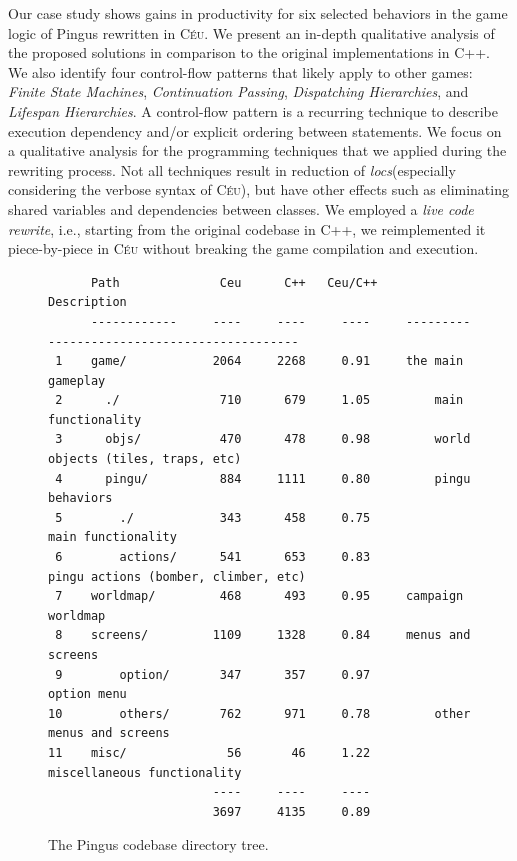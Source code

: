 \documentclass{vgtc}                          %
\newcommand{\CEU}{\textsc{C\'{e}u}\xspace}
\newcommand{\locs}{\emph{locs}\xspace}
\begin{document}
Our case study shows gains in productivity for six selected behaviors in the
game logic of Pingus rewritten in \CEU.
We present an in-depth qualitative analysis of the proposed solutions in
comparison to the original implementations in C++.
We also identify four control-flow patterns that likely apply to other games:
        \emph{Finite State Machines},
        \emph{Continuation Passing},
        \emph{Dispatching Hierarchies}, and
        \emph{Lifespan Hierarchies}.
%
A control-flow pattern is a recurring technique to describe execution
dependency and/or explicit ordering between statements.
We focus on a qualitative analysis for the programming techniques that we
applied during the rewriting process.
Not all techniques result in reduction of \locs (especially considering the
verbose syntax of \CEU), but have other effects such as eliminating shared
variables and dependencies between classes.
%
We employed a \emph{live code rewrite}, i.e., starting from the original
codebase in C++, we reimplemented it piece-by-piece in \CEU without breaking
the game compilation and execution.

\begin{figure}[t]
\begin{verbatim}
      Path              Ceu      C++   Ceu/C++    Description
      ------------     ----     ----     ----     --------------------------------------------
 1    game/            2064     2268     0.91     the main gameplay
 2      ./              710      679     1.05         main functionality
 3      objs/           470      478     0.98         world objects (tiles, traps, etc)
 4      pingu/          884     1111     0.80         pingu behaviors
 5        ./            343      458     0.75             main functionality
 6        actions/      541      653     0.83             pingu actions (bomber, climber, etc)
 7    worldmap/         468      493     0.95     campaign worldmap
 8    screens/         1109     1328     0.84     menus and screens
 9        option/       347      357     0.97         option menu
10        others/       762      971     0.78         other menus and screens
11    misc/              56       46     1.22     miscellaneous functionality
                       ----     ----     ----
                       3697     4135     0.89
\end{verbatim}
\caption{The Pingus codebase directory tree.
\label{tab.tree}
}
\end{figure}
\end{document}
